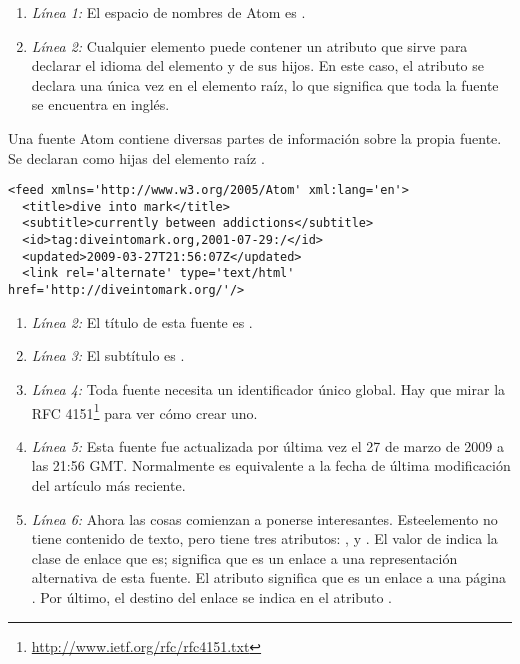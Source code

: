 \begin{enumerate}

\item \emph{Línea 1:} El espacio de nombres de Atom es .

\item \emph{Línea 2:} Cualquier elemento puede contener un atributo  que sirve para declarar el idioma del elemento y de sus hijos. En este caso, el atributo  se declara una única vez en el elemento raíz, lo que significa que toda la fuente se encuentra en inglés.

\end{enumerate}

Una fuente Atom contiene diversas partes de información sobre la propia fuente. Se declaran como hijas del elemento raíz .

\noindent\begin{minipage}{\textwidth}
\begin{lstlisting}[mathescape=True]
<feed xmlns='http://www.w3.org/2005/Atom' xml:lang='en'>
  <title>dive into mark</title>
  <subtitle>currently between addictions</subtitle>
  <id>tag:diveintomark.org,2001-07-29:/</id>
  <updated>2009-03-27T21:56:07Z</updated>
  <link rel='alternate' type='text/html' href='http://diveintomark.org/'/>
\end{lstlisting}
\end{minipage}

\begin{enumerate}

\item \emph{Línea 2:} El título de esta fuente es .

\item \emph{Línea 3:} El subtítulo es .

\item \emph{Línea 4:} Toda fuente necesita un identificador único global. Hay que mirar la RFC 4151\footnote{\href{http://www.ietf.org/rfc/rfc4151.txt}{http://www.ietf.org/rfc/rfc4151.txt}} para ver cómo crear uno.

\item \emph{Línea 5:} Esta fuente fue actualizada por última vez el 27 de marzo de 2009 a las 21:56 GMT. Normalmente es equivalente a la fecha de última modificación del artículo más reciente.

\item \emph{Línea 6:} Ahora las cosas comienzan a ponerse interesantes. Esteelemento  no tiene contenido de texto, pero tiene tres atributos: ,  y . El valor de  indica la clase de enlace que es;  significa que es un enlace a una representación alternativa de esta fuente. El atributo  significa que es un enlace a una página . Por último, el destino del enlace se indica en el atributo .

\end{enumerate}

